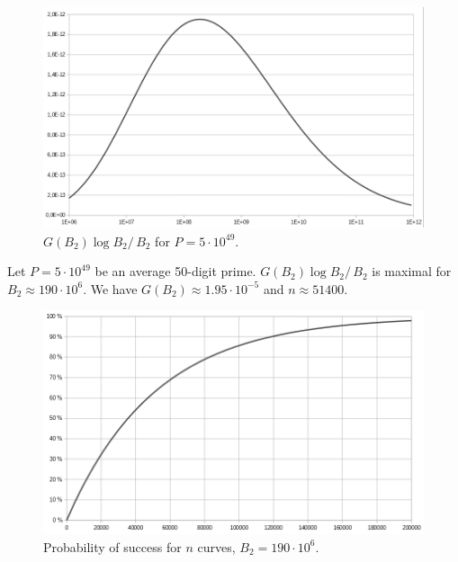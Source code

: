 \documentclass[a4paper, 11pt, pdftex]{report}
\theoremstyle{plain}
\theoremstyle{definition}
\begin{document}
\begin{figure}[!h]
	\centering
	\includegraphics[width=14cm, angle=0]{cond_max.pdf}
	\caption{\label{fig:max} $G(B_2) \log B_2 /\, B_2$ for $P = 5\cdot10^{49}$.}
\end{figure}

Let $P = 5\cdot10^{49}$ be an average 50-digit prime.
$G(B_2) \log B_2 /\, B_2$ is maximal for $B_2 \approx 190\cdot 10^6$. We have
$G(B_2) \approx 1.95\cdot 10^{-5}$ and $n \approx 51400$.

\begin{figure}[!h]
	\centering
	\includegraphics[width=14cm, angle=0]{n_curves.pdf}
	\caption{\label{fig:p_n} Probability of success for $n$ curves, $B_2 = 190\cdot 10^6$.}
\end{figure}
\end{document}
